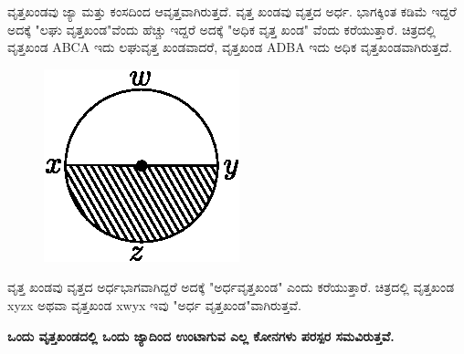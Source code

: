   ವೃತ್ತಖಂಡವು ಜ್ಯಾ ಮತ್ತು ಕಂಸದಿಂದ ಆವೃತ್ತವಾಗಿರುತ್ತದೆ. ವೃತ್ತ ಖಂಡವು ವೃತ್ತದ ಅರ್ಧ. ಭಾಗಕ್ಕಿಂತ ಕಡಿಮೆ ಇದ್ದರೆ ಅದಕ್ಕೆ "ಲಘು ವೃತ್ತಖಂಡ"ವೆಂದು ಹೆಚ್ಚು ಇದ್ದರೆ ಅದಕ್ಕೆ "ಅಧಿಕ ವೃತ್ತ ಖಂಡ" ವೆಂದು ಕರೆಯುತ್ತಾರೆ. ಚಿತ್ರದಲ್ಲಿ ವೃತ್ತಖಂಡ ABCA ಇದು ಲಘುವೃತ್ತ ಖಂಡವಾದರೆ, ವೃತ್ತಖಂಡ ADBA ಇದು ಅಧಿಕ ವೃತ್ತಖಂಡವಾಗಿರುತ್ತದೆ. 
 \begin{figure}[H]
\centering
\includegraphics[scale=.98]{src/figure/chap1/fig1-27.eps}
\end{figure}

 ವೃತ್ತ ಖಂಡವು ವೃತ್ತದ ಅರ್ಧಭಾಗವಾಗಿದ್ದರೆ ಅದಕ್ಕೆ "ಅರ್ಧವೃತ್ತಖಂಡ" ಎಂದು ಕರೆಯುತ್ತಾರೆ. ಚಿತ್ರದಲ್ಲಿ ವೃತ್ತಖಂಡ xyzx ಅಥವಾ ವೃತ್ತಖಂಡ xwyx ಇವು "ಅರ್ಧ ವೃತ್ತಖಂಡ"ವಾಗಿರುತ್ತವೆ. 
 
 \smallskip
 \noindent
 \textbf{ಒಂದು ವೃತ್ತಖಂಡದಲ್ಲಿ ಒಂದು ಜ್ಯಾದಿಂದ ಉಂಟಾಗುವ ಎಲ್ಲ ಕೋನಗಳು ಪರಸ್ಪರ ಸಮ\break ವಿರುತ್ತವೆ.}
 
